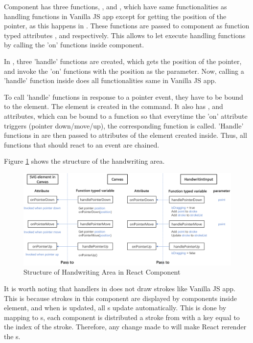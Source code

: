 \documentclass[12pt,twoside]{report}
\begin{document}
Component  has three functions, ,
 and , which have same
functionalities as handling functions in Vanilla JS app except for getting the position of the pointer, as this happens in . These functions are
passed to component  as function typed attributes
,  and  respectively.
This allows  to let  execute handling
functions by calling the 'on' functions inside  component. 

In , three 'handle' functions are created, which gets the position of the pointer, and invoke the 'on' functions with the position as the parameter. Now, calling a 'handle' function inside  does all functionalities same in Vanilla JS app.

To call 'handle' functions in response to a pointer event, they have to be bound
to the  element. The  element is created in the
 command. It also has , 
and  attributes, which can be bound to a function so that
everytime the 'on' attribute triggers (pointer down/move/up), the corresponding
function is called. 'Handle' functions in  are then passed to attributes of the  element created inside. Thus, all functions that should react to an event are chained.
 
Figure \ref{fig:react-handwriting-area} shows the structure of the handwriting area.
\begin{figure}[h]
    \centering
    \includegraphics[width=\linewidth]{figures/react-handwriting-area.png}
    \caption{Structure of Handwriting Area in React Component}
    \label{fig:react-handwriting-area}
\end{figure}

It is worth noting that handlers in  does not draw
strokes like Vanilla JS app. This is because strokes in this component are
displayed by  components inside  element, and when  is updated, all
s update automatically. This is done by mapping  to
s, each  component is distributed a stroke from
 with a key equal to the index of the stroke. Therefore, any
change made to  will make React rerender the s.
\end{document}
